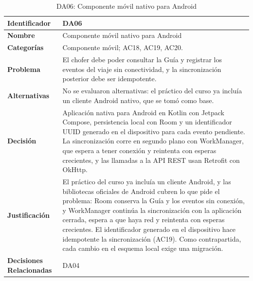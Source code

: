 \begin{table}[H]
    \small
    \centering
    \caption{DA06: Componente móvil nativo para Android}
    \label{tab:da06}
    \begin{tabular}{|p{4.1cm}|p{11.7cm}|}
        \hline
            \textbf{Identificador} & DA06 \\
        \hline
            \textbf{Nombre} & Componente móvil nativo para Android \\
        \hline
            \textbf{Categorías} & Componente móvil; AC18, AC19, AC20. \\
        \hline
            \textbf{Problema} & El chofer debe poder consultar la Guía y registrar los eventos del viaje sin conectividad, y la sincronización posterior debe ser idempotente. \\
        \hline
            \textbf{Alternativas} & No se evaluaron alternativas: el práctico del curso ya incluía un cliente Android nativo, que se tomó como base. \\
        \hline
            \textbf{Decisión} & Aplicación nativa para Android en Kotlin con Jetpack Compose, persistencia local con Room y un identificador UUID generado en el dispositivo para cada evento pendiente. La sincronización corre en segundo plano con WorkManager, que espera a tener conexión y reintenta con esperas crecientes, y las llamadas a la API REST usan Retrofit con OkHttp. \\
        \hline
            \textbf{Justificación} & El práctico del curso ya incluía un cliente Android, y las bibliotecas oficiales de Android cubren lo que pide el problema: Room conserva la Guía y los eventos sin conexión, y WorkManager continúa la sincronización con la aplicación cerrada, espera a que haya red y reintenta con esperas crecientes. El identificador generado en el dispositivo hace idempotente la sincronización (AC19). Como contrapartida, cada cambio en el esquema local exige una migración. \\
        \hline
            \textbf{Decisiones Relacionadas} & DA04 \\
        \hline
    \end{tabular}
\end{table}

